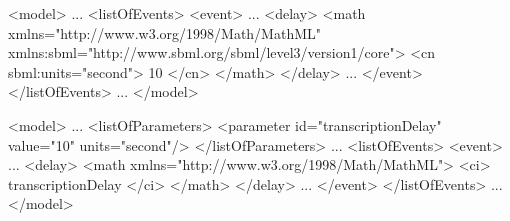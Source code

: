 \begin{example}
<model>
    ...
    <listOfEvents>
        <event>
            ...
            <delay>
                <math xmlns="http://www.w3.org/1998/Math/MathML"
                  xmlns:sbml="http://www.sbml.org/sbml/level3/version1/core">
                    <cn sbml:units="second"> 10 </cn>
                </math>
            </delay>
            ...
        </event>
    </listOfEvents>
    ...
</model>
\end{example}

\begin{example}
<model>
    ...
    <listOfParameters>
        <parameter id="transcriptionDelay" value="10" units="second"/>
    </listOfParameters>
    ...
    <listOfEvents>
        <event>
            ...
            <delay>
                <math xmlns="http://www.w3.org/1998/Math/MathML">
                    <ci> transcriptionDelay </ci>
                </math>
            </delay>
            ...
        </event>
    </listOfEvents>
    ...
</model>
\end{example}
